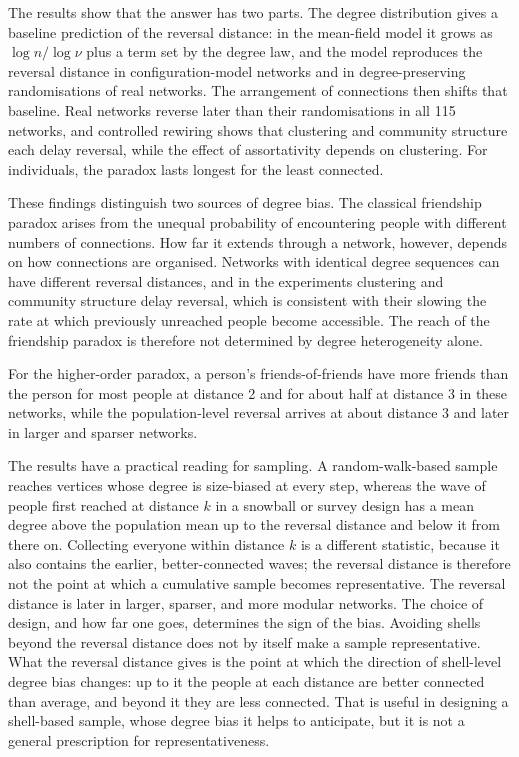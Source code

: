 \documentclass{nws}
\begin{document}
The results show that the answer has two parts. The degree distribution gives a baseline prediction of the reversal distance: in the mean-field model it grows as $\log n/\log\nu$ plus a term set by the degree law, and the model reproduces the reversal distance in configuration-model networks and in degree-preserving randomisations of real networks. The arrangement of connections then shifts that baseline. Real networks reverse later than their randomisations in all 115 networks, and controlled rewiring shows that clustering and community structure each delay reversal, while the effect of assortativity depends on clustering. For individuals, the paradox lasts longest for the least connected.

These findings distinguish two sources of degree bias. The classical friendship paradox arises from the unequal probability of encountering people with different numbers of connections. How far it extends through a network, however, depends on how connections are organised. Networks with identical degree sequences can have different reversal distances, and in the experiments clustering and community structure delay reversal, which is consistent with their slowing the rate at which previously unreached people become accessible. The reach of the friendship paradox is therefore not determined by degree heterogeneity alone.

For the higher-order paradox, a person's friends-of-friends have more friends than the person for most people at distance 2 and for about half at distance 3 in these networks, while the population-level reversal arrives at about distance 3 and later in larger and sparser networks.

The results have a practical reading for sampling. A random-walk-based sample reaches vertices whose degree is size-biased at every step, whereas the wave of people first reached at distance $k$ in a snowball or survey design has a mean degree above the population mean up to the reversal distance and below it from there on. Collecting everyone within distance $k$ is a different statistic, because it also contains the earlier, better-connected waves; the reversal distance is therefore not the point at which a cumulative sample becomes representative. The reversal distance is later in larger, sparser, and more modular networks. The choice of design, and how
far one goes, determines the sign of the bias. Avoiding shells beyond the reversal distance does not by itself make a sample representative. What the reversal distance gives is the point at which the direction of shell-level degree bias changes: up to it the people at each distance are better connected than average, and beyond it they are less connected. That is useful in designing a shell-based sample, whose degree bias it helps to anticipate, but it is not a general prescription for representativeness.
\end{document}
